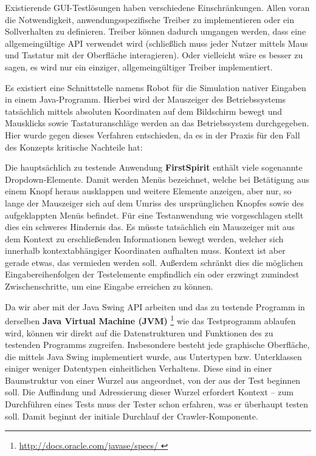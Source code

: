 Existierende GUI-Testlösungen haben verschiedene Einschränkungen. Allen voran die
Notwendigkeit, anwendungsspezifische Treiber zu implementieren oder ein Sollverhalten zu definieren.
Treiber können dadurch umgangen werden, dass eine allgemeingültige API verwendet wird (schließlich 
muss jeder Nutzer mittels Maus und Tastatur mit der Oberfläche interagieren). Oder vielleicht
wäre es besser zu sagen, es wird nur ein einziger, allgemeingültiger Treiber implementiert.

Es existiert eine Schnittstelle namens \glqq{}Robot\grqq{} \cite{java7insel} für die Simulation nativer Eingaben
in einem Java-Programm. Hierbei wird der Mauszeiger des Betriebssystems tatsächlich mittels
absoluten Koordinaten auf dem Bildschirm bewegt und Mausklicks sowie Tastaturanschläge
werden an das Betriebssystem durchgegeben. Hier wurde gegen dieses Verfahren entschieden,
da es in der Praxis für den Fall des Konzepts kritische Nachteile hat:

Die hauptsächlich zu testende Anwendung \textbf{FirstSpirit} enthält viele sogenannte Dropdown-Elemente.
Damit werden Menüs bezeichnet, welche bei Betätigung aus einem Knopf heraus ausklappen und
weitere Elemente anzeigen, aber nur, so lange der Mauszeiger sich auf dem Umriss des
ursprünglichen Knopfes sowie des aufgeklappten Menüs befindet. Für eine Testanwendung
wie vorgeschlagen stellt dies ein schweres Hindernis das. Es müsste tatsächlich ein
Mauszeiger mit aus dem Kontext zu erschließenden Informationen bewegt werden,
welcher sich innerhalb kontextabhängiger Koordinaten aufhalten muss. Kontext ist
aber gerade etwas, das vermieden werden soll. Außerdem schränkt dies die möglichen
Eingabereihenfolgen der Testelemente empfindlich ein oder erzwingt zumindest
Zwischenschritte, um eine Eingabe erreichen zu können.

Da wir aber mit der Java Swing API arbeiten und das zu testende Programm
in derselben \textbf{Java Virtual Machine (JVM)} 
\footnote{\url{ http://docs.oracle.com/javase/specs/ }} wie das Testprogramm 
ablaufen wird, können wir direkt auf die Datenstrukturen und Funktionen
des zu testenden Programms zugreifen. Insbesondere besteht jede graphische
Oberfläche, die mittels Java Swing implementiert wurde, aus Untertypen
bzw. Unterklassen einiger weniger Datentypen einheitlichen Verhaltens.
Diese sind in einer Baumstruktur von einer Wurzel aus angeordnet, von
der aus der Test beginnen soll. Die Auffindung und Adressierung dieser
Wurzel erfordert Kontext -- zum Durchführen eines Tests muss der Tester schon
erfahren, was er überhaupt testen soll. Damit beginnt der initiale
Durchlauf der Crawler-Komponente.

